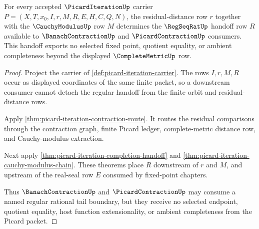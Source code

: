 \begin{theorem}
\label{thm:picard-iteration-regseqrat-tail-handoff}
For every accepted $\PicardIterationUp$ carrier $P=(X,T,x_0,I,r,M,R,E,H,C,Q,N)$, the residual-distance row $r$ together with the $\CauchyModulusUp$ row $M$ determines the $\RegSeqRatUp$ handoff row $R$ available to $\BanachContractionUp$ and $\PicardContractionUp$ consumers. This handoff exports no selected fixed point, quotient equality, or ambient completeness beyond the displayed $\CompleteMetricUp$ row.
\end{theorem}
\begin{proof}
Project the carrier of \autoref{def:picard-iteration-carrier}. The rows $I,r,M,R$ occur as displayed coordinates of the same finite packet, so a downstream consumer cannot detach the regular handoff from the finite orbit and residual-distance rows.

Apply \autoref{thm:picard-iteration-contraction-route}. It routes the residual comparisons through the contraction graph, finite Picard ledger, complete-metric distance row, and Cauchy-modulus extraction.

Next apply \autoref{thm:picard-iteration-completion-handoff} and \autoref{thm:picard-iteration-cauchy-modulus-chain}. These theorems place $R$ downstream of $r$ and $M$, and upstream of the real-seal row $E$ consumed by fixed-point chapters.

Thus $\BanachContractionUp$ and $\PicardContractionUp$ may consume a named regular rational tail boundary, but they receive no selected endpoint, quotient equality, host function extensionality, or ambient completeness from the Picard packet.
\end{proof}


